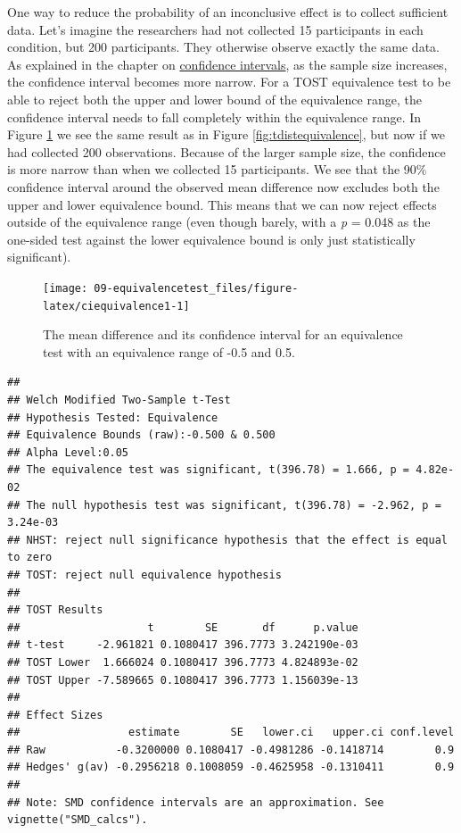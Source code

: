 \documentclass[
  oneside]{krantz}
\begin{document}
One way to reduce the probability of an inconclusive effect is to collect sufficient data. Let's imagine the researchers had not collected 15 participants in each condition, but 200 participants. They otherwise observe exactly the same data. As explained in the chapter on \protect\hyperlink{confint}{confidence intervals}, as the sample size increases, the confidence interval becomes more narrow. For a TOST equivalence test to be able to reject both the upper and lower bound of the equivalence range, the confidence interval needs to fall completely within the equivalence range. In Figure \ref{fig:ciequivalence1} we see the same result as in Figure \ref{fig:tdistequivalence}, but now if we had collected 200 observations. Because of the larger sample size, the confidence is more narrow than when we collected 15 participants. We see that the 90\% confidence interval around the observed mean difference now excludes both the upper and lower equivalence bound. This means that we can now reject effects outside of the equivalence range (even though barely, with a \emph{p} = 0.048 as the one-sided test against the lower equivalence bound is only just statistically significant).



\begin{figure}

{\centering \texttt{[image: 09-equivalencetest\_files/figure-latex/ciequivalence1-1]} 

}

\caption{The mean difference and its confidence interval for an equivalence test with an equivalence range of -0.5 and 0.5.}\label{fig:ciequivalence1}
\end{figure}

\begin{verbatim}
## 
## Welch Modified Two-Sample t-Test
## Hypothesis Tested: Equivalence
## Equivalence Bounds (raw):-0.500 & 0.500
## Alpha Level:0.05
## The equivalence test was significant, t(396.78) = 1.666, p = 4.82e-02
## The null hypothesis test was significant, t(396.78) = -2.962, p = 3.24e-03
## NHST: reject null significance hypothesis that the effect is equal to zero 
## TOST: reject null equivalence hypothesis
## 
## TOST Results 
##                    t        SE       df      p.value
## t-test     -2.961821 0.1080417 396.7773 3.242190e-03
## TOST Lower  1.666024 0.1080417 396.7773 4.824893e-02
## TOST Upper -7.589665 0.1080417 396.7773 1.156039e-13
## 
## Effect Sizes 
##                 estimate        SE   lower.ci   upper.ci conf.level
## Raw           -0.3200000 0.1080417 -0.4981286 -0.1418714        0.9
## Hedges' g(av) -0.2956218 0.1008059 -0.4625958 -0.1310411        0.9
## 
## Note: SMD confidence intervals are an approximation. See vignette("SMD_calcs").
\end{verbatim}
\end{document}
